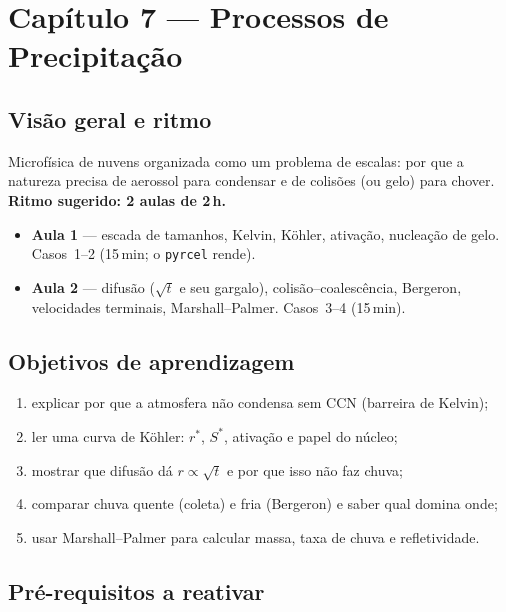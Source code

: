\section{Capítulo 7 --- Processos de Precipitação}

\subsection*{Visão geral e ritmo}

Microfísica de nuvens organizada como um problema de escalas: por que a
natureza precisa de aerossol para condensar e de colisões (ou gelo) para
chover. \textbf{Ritmo sugerido: 2 aulas de 2\,h.}

\begin{itemize}
  \item \textbf{Aula 1} — escada de tamanhos, Kelvin, Köhler, ativação,
        nucleação de gelo. Casos~1--2 (15\,min; o \texttt{pyrcel} rende).
  \item \textbf{Aula 2} — difusão ($\sqrt t$ e seu gargalo),
        colisão--coalescência, Bergeron, velocidades terminais,
        Marshall--Palmer. Casos~3--4 (15\,min).
\end{itemize}

\subsection*{Objetivos de aprendizagem}

\begin{enumerate}
  \item explicar por que a atmosfera não condensa sem CCN (barreira de
        Kelvin);
  \item ler uma curva de Köhler: $r^*$, $S^*$, ativação e papel do núcleo;
  \item mostrar que difusão dá $r\propto\sqrt t$ e por que isso não faz
        chuva;
  \item comparar chuva quente (coleta) e fria (Bergeron) e saber qual domina
        onde;
  \item usar Marshall--Palmer para calcular massa, taxa de chuva e
        refletividade.
\end{enumerate}

\subsection*{Pré-requisitos a reativar}


